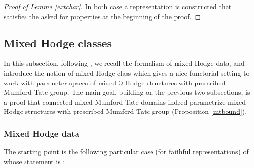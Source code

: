\documentclass[10pt]{article}
\numberwithin{equation}{subsection}
\theoremstyle{plain}
\theoremstyle{definition}
\theoremstyle{remark}
\newcommand{\Q}{\mathbb Q}
\begin{document}
\begin{proof}[Proof of Lemma \ref{extchar}]
In both case a representation is constructed that satisfies the asked for properties at the beginning of the proof.
\end{proof}
\subsection{Mixed Hodge classes}
In this subsection, following \cite{klingler_atyp}, we recall the formalism of mixed Hodge data, and introduce the notion of mixed Hodge class which gives a nice functorial setting to work with parameter spaces of mixed $\Q$-Hodge structures with prescribed Mumford-Tate group. The main goal, building on the previous two subsections, is a proof that connected mixed Mumford-Tate domains indeed parametrize mixed Hodge structures with prescribed Mumford-Tate group (Proposition \ref{mtbound}).
\subsubsection*{Mixed Hodge data}
The starting point is the following particular case (for faithful representations) of \cite[(1.7)]{pinkthese} whose statement is \cite[Prop. 3.1]{klingler_atyp}:
\end{document}
